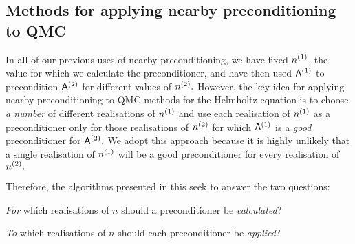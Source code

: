 \subsection{Methods for applying nearby preconditioning to QMC}\label{sec:nbpcqmcnum}
In all of our previous uses of nearby preconditioning, we have fixed ${n}^{(1)}$, the value for which we calculate the preconditioner, and have then used $\mathsf{A}^{(1)}$ to precondition $\mathsf{A}^{(2)}$ for different values of ${n}^{(2)}.$ However, the key idea for applying nearby preconditioning to QMC methods for the Helmholtz equation is to choose \emph{a number} of different realisations of ${n}^{(1)}$ and use each realisation of ${n}^{(1)}$ as a preconditioner only for those  realisations of ${n}^{(2)}$ for which $\mathsf{A}^{(1)}$ is a \emph{good} preconditioner for $\mathsf{A}^{(2)}.$ We adopt this approach because it is highly unlikely that a single realisation of ${n}^{(1)}$ will be a good preconditioner for every realisation of ${n}^{(2)}.$

Therefore, the algorithms presented in this  seek to answer the two questions:
\ben
\item \emph{For} which realisations of $n$ should a preconditioner be \emph{calculated}?
  \item \emph{To} which realisations of $n$ should each preconditioner be \emph{applied}?
\een

